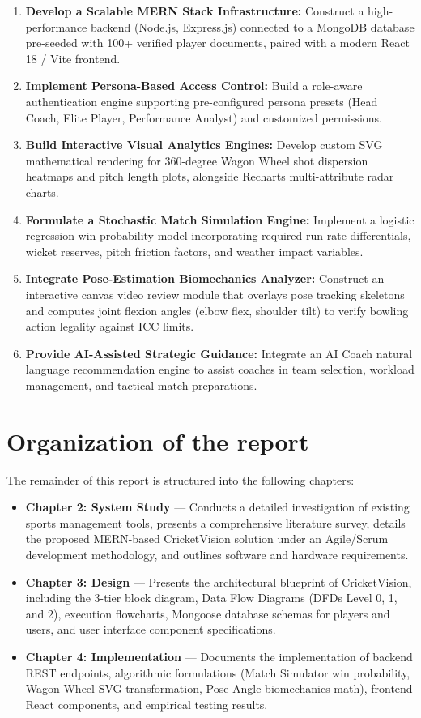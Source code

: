 \documentclass[12pt,a4paper]{report}
\begin{document}
\begin{enumerate}
    \item \textbf{Develop a Scalable MERN Stack Infrastructure:} Construct a high-performance backend (Node.js, Express.js) connected to a MongoDB database pre-seeded with 100+ verified player documents, paired with a modern React 18 / Vite frontend.
    \item \textbf{Implement Persona-Based Access Control:} Build a role-aware authentication engine supporting pre-configured persona presets (Head Coach, Elite Player, Performance Analyst) and customized permissions.
    \item \textbf{Build Interactive Visual Analytics Engines:} Develop custom SVG mathematical rendering for 360-degree Wagon Wheel shot dispersion heatmaps and pitch length plots, alongside Recharts multi-attribute radar charts.
    \item \textbf{Formulate a Stochastic Match Simulation Engine:} Implement a logistic regression win-probability model incorporating required run rate differentials, wicket reserves, pitch friction factors, and weather impact variables.
    \item \textbf{Integrate Pose-Estimation Biomechanics Analyzer:} Construct an interactive canvas video review module that overlays pose tracking skeletons and computes joint flexion angles (elbow flex, shoulder tilt) to verify bowling action legality against ICC limits.
    \item \textbf{Provide AI-Assisted Strategic Guidance:} Integrate an AI Coach natural language recommendation engine to assist coaches in team selection, workload management, and tactical match preparations.
\end{enumerate}

\section{Organization of the report}
The remainder of this report is structured into the following chapters:

\begin{itemize}
    \item \textbf{Chapter 2: System Study} — Conducts a detailed investigation of existing sports management tools, presents a comprehensive literature survey, details the proposed MERN-based CricketVision solution under an Agile/Scrum development methodology, and outlines software and hardware requirements.
    \item \textbf{Chapter 3: Design} — Presents the architectural blueprint of CricketVision, including the 3-tier block diagram, Data Flow Diagrams (DFDs Level 0, 1, and 2), execution flowcharts, Mongoose database schemas for players and users, and user interface component specifications.
    \item \textbf{Chapter 4: Implementation} — Documents the implementation of backend REST endpoints, algorithmic formulations (Match Simulator win probability, Wagon Wheel SVG transformation, Pose Angle biomechanics math), frontend React components, and empirical testing results.
\end{itemize}
\end{document}
